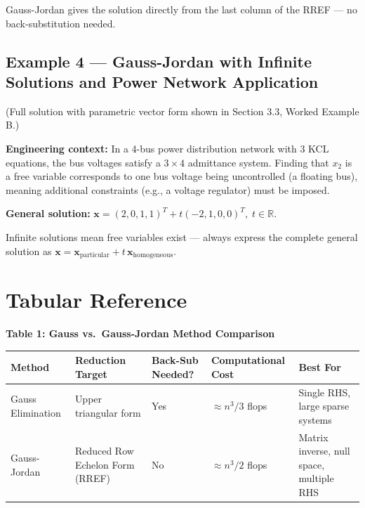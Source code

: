 \documentclass[12pt,a4paper]{article}
\begin{document}
\begin{learnbox}
Gauss-Jordan gives the solution directly from the last column of the RREF ---
no back-substitution needed.
\end{learnbox}

\subsection*{Example 4 --- Gauss-Jordan with Infinite Solutions and Power Network Application}

(Full solution with parametric vector form shown in Section 3.3, Worked Example B.)

\textbf{Engineering context:} In a 4-bus power distribution network with 3 KCL equations,
the bus voltages satisfy a $3 \times 4$ admittance system.
Finding that $x_2$ is a free variable corresponds to one bus voltage being uncontrolled
(a floating bus), meaning additional constraints (e.g., a voltage regulator) must be imposed.

\textbf{General solution:}
$\mathbf{x} = (2,0,1,1)^T + t(-2,1,0,0)^T,\; t \in \mathbb{R}$.

\begin{learnbox}
Infinite solutions mean free variables exist --- always express the complete general solution as
$\mathbf{x} = \mathbf{x}_{\text{particular}} + t\,\mathbf{x}_{\text{homogeneous}}$.
\end{learnbox}

\section{Tabular Reference}

\begin{center}
\textbf{Table 1: Gauss vs.\ Gauss-Jordan Method Comparison}
\vspace{0.4em}

\begin{tabular}{@{}p{2.5cm}p{3cm}p{2.5cm}p{2.8cm}p{3cm}@{}}
\toprule
\textbf{Method} & \textbf{Reduction Target} & \textbf{Back-Sub Needed?} & \textbf{Computational Cost} & \textbf{Best For} \\
\midrule
Gauss Elimination & Upper triangular form & Yes & $\approx n^3/3$ flops & Single RHS, large sparse systems \\
\addlinespace
Gauss-Jordan & Reduced Row Echelon Form (RREF) & No & $\approx n^3/2$ flops & Matrix inverse, null space, multiple RHS \\
\bottomrule
\end{tabular}
\end{center}
\end{document}
